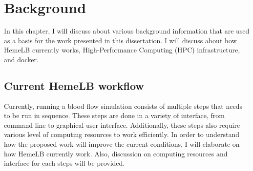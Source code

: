  

\chapter[Background]{Background}

In this chapter, I will discuss about various background information that are used as a basis for the work presented in this dissertation. I will discuss about how HemeLB currently works, High-Performance Computing (HPC) infrastructure, and docker.


\section{Current HemeLB workflow}

Currently, running a blood flow simulation consists of multiple steps that needs to be run in sequence. These steps are done in a variety of interface, from command line to graphical user interface. Additionally, these steps also require various level of computing resources to work efficiently. In order to understand how the proposed work will improve the current conditions, I will elaborate on how HemeLB currently work. Also, discussion on computing resources and interface for each steps will be provided.




\vspace{1cm}

\noindent%
\begin{minipage}{\linewidth}%
\label{fig:hemelb-workflow}%
\end{minipage}

\vspace{1cm}


